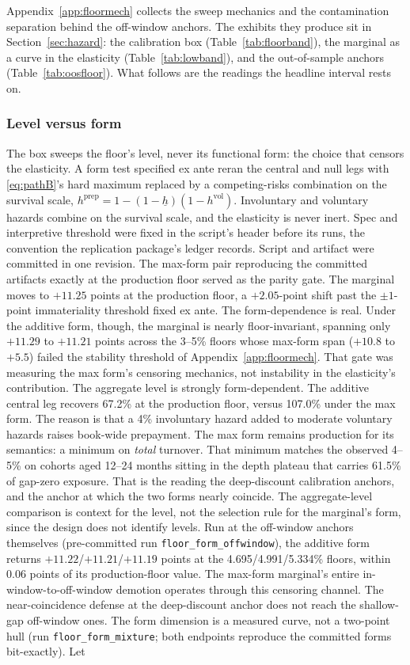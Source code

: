 \documentclass[12pt]{article}
\begin{document}
Appendix~\ref{app:floormech} collects the sweep mechanics and the contamination separation behind the off-window anchors. The exhibits they produce sit in Section~\ref{sec:hazard}: the calibration box (Table~\ref{tab:floorband}), the marginal as a curve in the elasticity (Table~\ref{tab:lowband}), and the out-of-sample anchors (Table~\ref{tab:oosfloor}). What follows are the readings the headline interval rests on.

\subsubsection{Level versus form}

The box sweeps the floor's level, never its functional form: the choice that censors the elasticity. A form test specified ex ante reran the central and null legs with \eqref{eq:pathB}'s hard maximum replaced by a competing-risks combination on the survival scale, $h^{\mathrm{prep}} = 1 - (1 - \underline{h})(1 - h^{\mathrm{vol}})$. Involuntary and voluntary hazards combine on the survival scale, and the elasticity is never inert. Spec and interpretive threshold were fixed in the script's header before its runs, the convention the replication package's ledger records. Script and artifact were committed in one revision. The max-form pair reproducing the committed artifacts exactly at the production floor served as the parity gate. The marginal moves to $+11.25$ points at the production floor, a $+2.05$-point shift past the $\pm 1$-point immateriality threshold fixed ex ante. The form-dependence is real. Under the additive form, though, the marginal is nearly floor-invariant, spanning only $+11.29$ to $+11.21$ points across the 3--5\% floors whose max-form span ($+10.8$ to $+5.5$) failed the stability threshold of Appendix~\ref{app:floormech}. That gate was measuring the max form's censoring mechanics, not instability in the elasticity's contribution. The aggregate level is strongly form-dependent. The additive central leg recovers 67.2\% at the production floor, versus 107.0\% under the max form. The reason is that a 4\% involuntary hazard added to moderate voluntary hazards raises book-wide prepayment. The max form remains production for its semantics: a minimum on \emph{total} turnover. That minimum matches the observed 4--5\% on cohorts aged 12--24 months sitting in the depth plateau that carries 61.5\% of gap-zero exposure. That is the reading the deep-discount calibration anchors, and the anchor at which the two forms nearly coincide. The aggregate-level comparison is context for the level, not the selection rule for the marginal's form, since the design does not identify levels. Run at the off-window anchors themselves (pre-committed run \texttt{floor\_form\_offwindow}), the additive form returns $+11.22$/$+11.21$/$+11.19$ points at the 4.695/4.991/5.334\% floors, within 0.06 points of its production-floor value. The max-form marginal's entire in-window-to-off-window demotion operates through this censoring channel. The near-coincidence defense at the deep-discount anchor does not reach the shallow-gap off-window ones. The form dimension is a measured curve, not a two-point hull (run \texttt{floor\_form\_mixture}; both endpoints reproduce the committed forms bit-exactly). Let 
\end{document}
